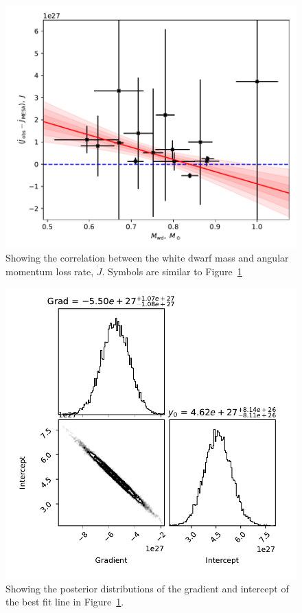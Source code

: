 \begin{figure}
    \centering
    \includegraphics[width=\textwidth]{figures/results/Mdot/Mwd_Jdot_ex.pdf}
    \caption{Showing the correlation between the white dwarf mass and angular momentum loss rate, $\dot J$. Symbols are similar to Figure~\ref{fig:discussion:white dwarf mass vs Jdot fit}}
    \label{fig:discussion:white dwarf mass vs Jdot fit}
\end{figure}
\begin{figure}
    \centering
    \includegraphics[width=\textwidth]{figures/results/Mdot/Mwd_Jdot_ex_corner.pdf}
    \caption{Showing the posterior distributions of the gradient and intercept of the best fit line in Figure~\ref{fig:discussion:white dwarf mass vs Jdot fit}.}
    \label{fig:discussion:white dwarf mass vs Jdot corner}
\end{figure}

